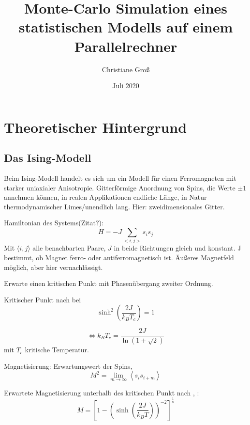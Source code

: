 \documentclass{scrreprt}
\title{Monte-Carlo Simulation eines statistischen Modells auf einem Parallelrechner}
\date{Juli 2020}
\author{Christiane Groß}
\begin{document}
	\maketitle
	
	
	\tableofcontents
	
	\clearpage
	
	\chapter{Theoretischer Hintergrund}
	
	\section{Das Ising-Modell}
	Beim Ising-Modell handelt es sich um ein Modell für einen Ferromagneten mit starker uniaxialer Anisotropie\cite{binderheermann}. Gitterförmige Anordnung von Spins, die Werte $\pm1$ annehmen können, in realen Applikationen endliche Länge, in Natur thermodynamischer Limes/unendlich lang. Hier: zweidimensionales Gitter.
	
	Hamiltonian des Systems(Zitat?):
	\begin{equation}
	H=-J\sum_{<i,j>}s_is_j
	\label{eq:hamiltonianising}
	\end{equation}
	Mit $\langle i,j\rangle$ alle benachbarten Paare, $J$ in beide Richtungen gleich und konstant. J bestimmt, ob Magnet ferro- oder antiferromagnetisch ist. Äußeres Magnetfeld möglich, aber hier vernachlässigt.

	
	Erwarte einen kritischen Punkt mit Phasenübergang zweiter Ordnung. \cite{OnsagerCrystal1}
	
	Kritischer Punkt nach \cite{OnsagerCrystal1} bei \[\sinh^2\left(\frac{2J}{k_BT_c}\right) =1\]
	
	\begin{equation}
	\Leftrightarrow k_BT_c=\frac{2J}{\ln(1+\sqrt{2})}
	\label{eq:kritischetemperatur}
	\end{equation}
	mit $T_c$ kritische Temperatur.
	
	Magnetisierung: Erwartungswert der Spins, \[
	M^2=\lim\limits_{m\to\infty}\left\langle s_i s_{i+m}\right\rangle \]
	
	Erwartete Magnetisierung unterhalb des kritischen Punkt nach \cite{YangMagnetization}, \cite{MontrollMagnetization}:
	\begin{equation} M=\left[1-\left(\sinh\left(\frac{2J}{k_BT}\right)\right)^{-2}\right]^{\frac{1}{8}}
	\label{eq:magnetisierungsgleichungliteratur}
	\end{equation}
	
\end{document}
